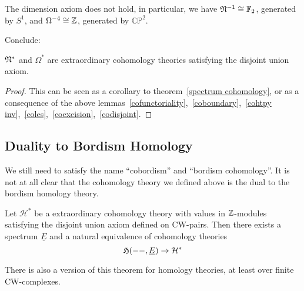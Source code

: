 \documentclass[a4paper,11pt]{article}
\begin{document}
\begin{remark}
    The dimension axiom does not hold, in particular, we have \(\mathfrak{N}^{-1}\cong\mathbb{F}_2\), generated by \(S^1\), and \(\Omega^{-4}\cong\mathbb{Z}\), generated by \(\mathbb{CP}^2\).
\end{remark}


Conclude:
\begin{theorem}
    \(\mathfrak{N}^\ast\) and \(\Omega^\ast\) are extraordinary cohomology theories satisfying the disjoint union axiom.
\end{theorem}

\begin{proof}
    This can be seen as a corollary to theorem\ \ref{spectrum cohomology}, or as a consequence of the above lemmas\ \ref{cofunctoriality},\ \ref{coboundary},\ \ref{cohtpy inv},\ \ref{coles},\ \ref{coexcision},\ \ref{codisjoint}.
\end{proof}

\subsection{Duality to Bordism Homology}

We still need to satisfy the name \enquote{cobordism} and \enquote{bordism cohomology}. It is not at all clear that the cohomology theory we defined above is the dual to the bordism homology theory.

\begin{theorem}%
    Let \(\mathcal{H}^\ast\) be a extraordinary cohomology theory with values in \(\mathbb{Z}\)-modules satisfying the disjoint union axiom defined on CW-pairs. Then there exists a spectrum \(\underline E\) and a natural equivalence of cohomology theories
    \[\mathfrak{H}(--,\underline{E})\to\mathcal{H}^\ast\]
\end{theorem}

\begin{remark}
    There is also a version of this theorem for homology theories, at least over finite CW-complexes.
\end{remark}
\end{document}
